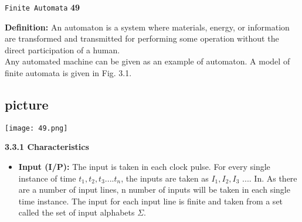 \documentclass{article}
\begin{document}
\begin{flushright}
 \texttt{Finite Automata} \hspace*{1cm} \textbf{49}
\end{flushright}

\vspace*{0.2cm}
\begin{multicols}{2}
\textbf{Definition:} An automaton is a system where materials,
energy, or information are transformed and transmitted
for performing some operation without the direct
participation of a human.\\
\hspace*{0.5cm} Any automated machine can be given as an example
of automaton. A model of finite automata is given in
Fig. 3.1.\\

\vspace*{0.2cm}
\begin{center}
\section{picture}
\texttt{[image: 49.png]}
\end{center}
\end{multicols}

\large{
\textbf{3.3.1 Characteristics}\\
}

\vspace*{0.2cm}

\begin{itemize}
  \item \textbf{Input (I/P):} The input is taken in each clock pulse. For every single instance of time $t_{1}, t_{2}, t_{3} .... t_{n}$,
the inputs are taken as $I_{1}, I_{2}, I_{3}$ .... In. As there are a number of input lines, n number of inputs will
be taken in each single time instance. The input for each input line is finite and taken from a set
called the set of input alphabets $\Sigma$.\\
\end{itemize}
\end{document}
